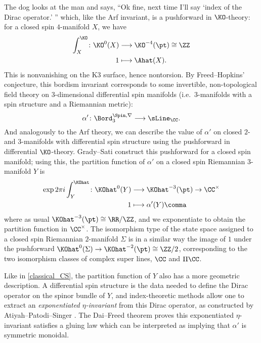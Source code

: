 \begin{example}
{The dog looks at the man and says, ``Ok fine, next time I'll say `index of the Dirac operator.' ''}
which, like the Arf invariant, is a pushforward in $\KO$-theory: for a closed spin $4$-manifold $X$, we have
\begin{equation}
\begin{aligned}
	\int_X^{\KO}\colon \KO^0(X) &\longrightarrow \KO^{-4}(\pt)\cong\ZZ\\
	1 &\longmapsto \Ahat(X).
\end{aligned}
\end{equation}
This is nonvanishing on the K3 surface, hence nontorsion. By Freed--Hopkins'
conjecture, this bordism invariant corresponds to some invertible, non-topological field theory on $3$-dimensional
differential spin manifolds (i.e.\ $3$-manifolds with a spin structure and a Riemannian metric):
\begin{equation}
	\alpha'\colon\Bord_3^{\Spin, \nabla}\longrightarrow \sLine_\CC.
\end{equation}
And analogously to the Arf theory, we can describe the value of $\alpha'$ on closed $2$- and $3$-manifolds with
differential spin structure using the pushforward in differential $\KO$-theory. Grady--Sati \cite[\S 4.3]{GS21}
construct this pushforward for a closed spin manifold; using this, the partition function of $\alpha'$ on a closed
spin Riemannian $3$-manifold $Y$ is
\begin{equation}
\begin{aligned}
	\exp2\pi i\int_Y^{\KOhat}\colon \KOhat^0(Y) &\longrightarrow \KOhat^{-3}(\pt)\to
	\CC^\times\\
	1 &\longmapsto \alpha'(Y) \comma
\end{aligned}
\end{equation}
where as usual $\KOhat^{-3}(\pt)\cong\RR/\ZZ$, and we exponentiate to obtain the partition function in
$\CC^\times$. The isomorphism type of the state space assigned to a closed spin Riemannian $2$-manifold $\Sigma$ is
in a similar way the image of $1$ under the pushforward
$\KOhat^0(\Sigma)\to\KOhat^{-2}(\pt)\cong\ZZ/2$, corresponding to the two isomorphism classes of
complex super lines, $\CC$ and $\Pi\CC$.

Like in \cref{classical_CS}, the partition function of $Y$ also has a more geometric description. A differential
spin structure is the data needed to define the Dirac operator on the spinor bundle of $Y$, and index-theoretic
methods allow one to extract an \textit{exponentiated $\eta$-invariant} from this Dirac operator, as constructed by
Atiyah--Patodi--Singer \cite{APS1, APS2, APS3}. The Dai--Freed theorem \cite{DF94} proves this exponentiated
$\eta$-invariant satisfies a gluing law which can be interpreted as implying that $\alpha'$ is symmetric monoidal.
\end{example}
